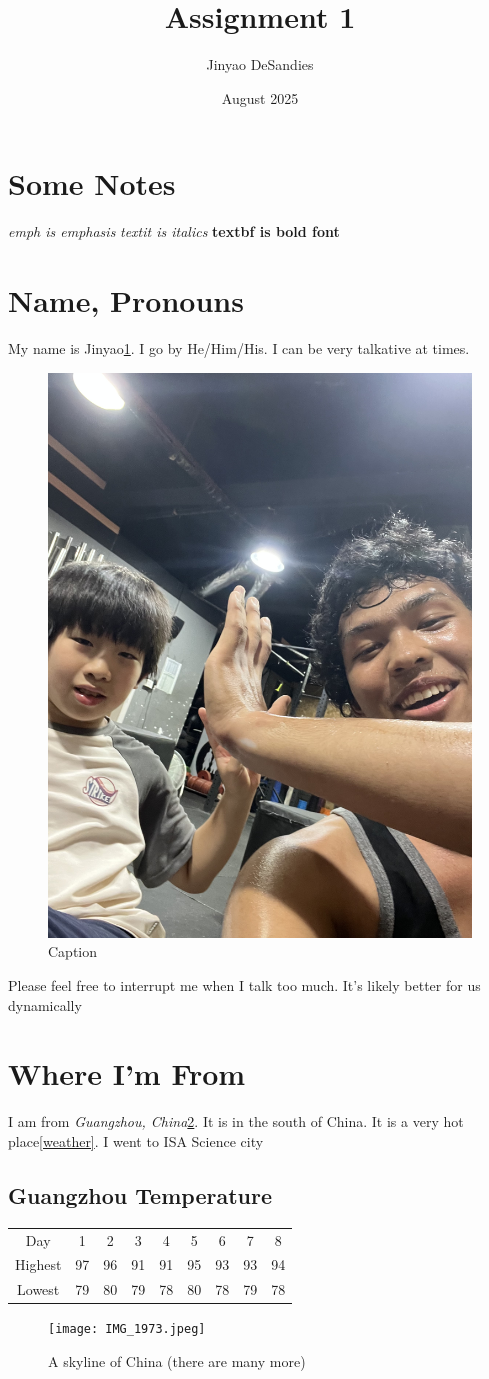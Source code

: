 \documentclass{article}
\title{Assignment 1}
\author{Jinyao DeSandies}
\date{August 2025}
\begin{document}
\maketitle

\section{Some Notes}
\emph{   emph is emphasis}
\textit{ textit is italics}
\textbf{ textbf is bold font}
\section{Name, Pronouns}
My name is Jinyao\ref{fig:me}. I go by He/Him/His. I can be very talkative at times. 
\begin{figure}
    \centering
    \includegraphics[width=0.5\linewidth]{IMG_3908.jpeg}
    \caption{Caption}
    \label{fig:me}
\end{figure}


Please feel free to interrupt me when I talk too much. It's likely better for us dynamically

\section{Where I'm From}
I am from \emph{Guangzhou, China}\ref{fig:Zhujiang Newtown}. It is in the south of China. It is a very hot place\ref{weather}. I went to ISA Science city
\subsection{Guangzhou Temperature}
\begin{tabular}{c c| c| c| c| c| c| c| c}
         Day &1 & 2&3&4&5&6&7&8 \\
        Highest&97&96&91&91&95&93&93&94 \\
        Lowest& 79&80&79&78&80&78&79&78
        \label{weather}
    \end{tabular}
\begin{figure}
    \centering
    \texttt{[image: IMG\_1973.jpeg]}
    \caption{A skyline of China (there are many more)}
    \label{fig:Zhujiang Newtown}
\end{figure}
\end{document}
